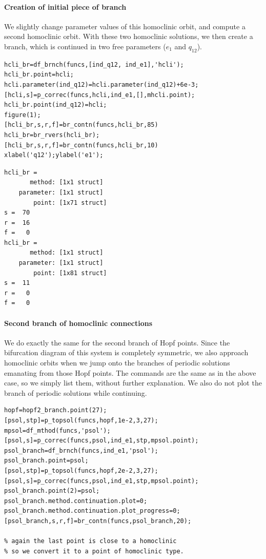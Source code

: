 \documentclass[10pt]{scrartcl}
\begin{document}
{\paragraph{Creation of initial piece of branch}
We slightly change parameter values of this homoclinic orbit, and
compute a second homoclinic orbit.  With these two homoclinic
solutions, we then create a branch, which is continued in two free
parameters ($e_1$ and $q_{12}$).
\begin{lstlisting}
hcli_br=df_brnch(funcs,[ind_q12, ind_e1],'hcli');
hcli_br.point=hcli;
hcli.parameter(ind_q12)=hcli.parameter(ind_q12)+6e-3;
[hcli,s]=p_correc(funcs,hcli,ind_e1,[],mhcli.point);
hcli_br.point(ind_q12)=hcli;
figure(1);
[hcli_br,s,r,f]=br_contn(funcs,hcli_br,85)
hcli_br=br_rvers(hcli_br);
[hcli_br,s,r,f]=br_contn(funcs,hcli_br,10)
xlabel('q12');ylabel('e1');  
\end{lstlisting}
{\small
\begin{verbatim}
hcli_br = 
       method: [1x1 struct]
    parameter: [1x1 struct]
        point: [1x71 struct]
s =  70
r =  16
f =   0
hcli_br = 
       method: [1x1 struct]
    parameter: [1x1 struct]
        point: [1x81 struct]
s =  11
r =   0
f =   0
\end{verbatim}
}
\paragraph{Second branch of homoclinic connections}
We do exactly the same for the second branch of Hopf points.  Since
the bifurcation diagram of this system is completely symmetric, we
also approach homoclinic orbits when we jump onto the branches of
periodic solutions emanating from those Hopf points.  The commands are
the same as in the above case, so we simply list them, without further
explanation.  We also do not plot the branch of periodic solutions
while continuing.  
\begin{lstlisting}
hopf=hopf2_branch.point(27);
[psol,stp]=p_topsol(funcs,hopf,1e-2,3,27);
mpsol=df_mthod(funcs,'psol');
[psol,s]=p_correc(funcs,psol,ind_e1,stp,mpsol.point);
psol_branch=df_brnch(funcs,ind_e1,'psol');
psol_branch.point=psol;
[psol,stp]=p_topsol(funcs,hopf,2e-2,3,27);
[psol,s]=p_correc(funcs,psol,ind_e1,stp,mpsol.point);
psol_branch.point(2)=psol;
psol_branch.method.continuation.plot=0;
psol_branch.method.continuation.plot_progress=0;
[psol_branch,s,r,f]=br_contn(funcs,psol_branch,20);

% again the last point is close to a homoclinic
% so we convert it to a point of homoclinic type.


\end{lstlisting}}
\end{document}
